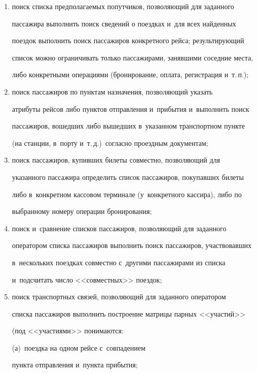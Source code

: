 \begin{enumerate}[(1)]


\item поиск списка предполагаемых попутчиков, позволяющий для заданного 


пассажира выполнить поиск сведений о поездках и~для всех найденных 


поездок выполнить поиск пассажиров конкретного рейса; результирующий 


список можно ограничивать только пассажирами, занявшими соседние места, 


либо конкретными операциями (бронирование, оплата, регистрация и~т.\,п.);


\item поиск пассажиров по пунктам назначения, позволяющий указать 


атрибуты рейсов либо пунктов отправления и~прибытия и~выполнить поиск 


пассажиров, вошедших либо вышедших в~указанном транспортном пункте 


(на станции, в~порту и~т.\,д.)\ согласно проездным документам;


\item поиск пассажиров, купивших билеты совместно, позволяющий для 


указанного пассажира определить список пассажиров, покупавших билеты 


либо в~конкретном кассовом терминале (у~конкретного кассира), либо по 


выбранному номеру операции бронирования;


\item поиск и~сравнение списков пассажиров, позволяющий для заданного 


оператором списка пассажиров выполнить поиск пассажиров, участвовавших 


в~нескольких поездках совместно с~другими пассажирами из списка 


и~подсчитать число <<совместных>> поездок;


\item поиск транспортных связей, позволяющий для заданного оператором 


списка пассажиров выполнить построение матрицы парных <<участий>> 


(под <<учас\-ти\-ями>> понимаются: 


(а)~поездка на одном рейсе с~совпадением 


пункта от\-прав\-ле\-ния и~пункта при\-бы\-тия; 



\end{enumerate}
